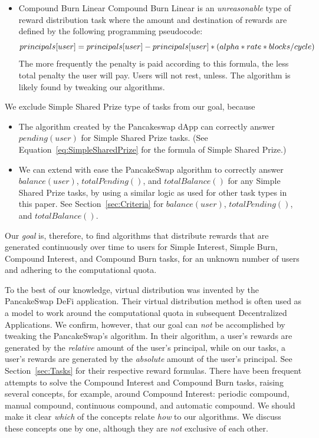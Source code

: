 \documentclass{article}
\begin{document}
\begin{itemize}
  \item Compound Burn Linear \newline
  \label{sec:CompoundBurnLinear}
  Compound Burn Linear is an \textit{unreasonable} type of reward distribution task 
  where the amount and destination of rewards are defined by the following programming 
  pseudocode:  
  \begin{equation} \label{eq:SimpCompoundBurnLinearleInterest}
    \\principals[user] = principals[user] - principals[user] * (alpha * rate * blocks/cycle)
  \end{equation}
  The more frequently the penalty is paid according to this formula, 
  the less total penalty the user will pay. Users will not rest, unless.
  The algorithm is likely found by tweaking our algorithms.
\end{itemize}

We exclude Simple Shared Prize type of tasks from our goal, because 
\begin{itemize}
  \item The algorithm created by the Pancakeswap dApp can correctly answer 
  $pending(user)$ for Simple Shared Prize tasks.
  (See Equation~\ref{eq:SimpleSharedPrize} for the formula of Simple Shared Prize.)
  \item We can extend with ease the PancakeSwap algorithm to correctly answer $balance(user)$, 
  $totalPending()$, and $totalBalance()$ for any Simple Shared Prize tasks, 
  by using a similar logic as used for other task types in this paper.
  See Section~\ref{sec:Criteria} for $balance(user)$, $totalPending()$, 
  and $totalBalance()$.
\end{itemize}

Our \textit{goal} is, therefore, to find algorithms that distribute rewards 
that are generated continuously over time to users for Simple Interest, Simple Burn, 
Compound Interest, and Compound Burn tasks, for an unknown number of users and 
adhering to the computational quota.

To the best of our knowledge, virtual distribution was invented by the PancakeSwap 
DeFi application.
Their virtual distribution method is often used as a model to work around the computational 
quota in subsequent Decentralized Applications.
We confirm, however, that our goal can \textit{not} be accomplished by tweaking the 
PancakeSwap’s algorithm.
In their algorithm, a user's rewards are generated by 
the \textit{relative} amount of the user's principal, while on our tasks, 
a user's rewards are generated by the \textit{absolute} amount of the user's principal. 
See Section~\ref{sec:Tasks} for their respective reward formulas.
There have been frequent attempts to solve the Compound Interest and Compound Burn 
tasks, raising several concepts, for example, around Compound Interest: 
periodic compound, manual compound, continuous compound, and automatic compound.
We should make it clear \textit{which} of the concepts relate \textit{how} to our algorithms.
We discuss these concepts one by one, although they are \textit{not} exclusive of 
each other.
\end{document}
